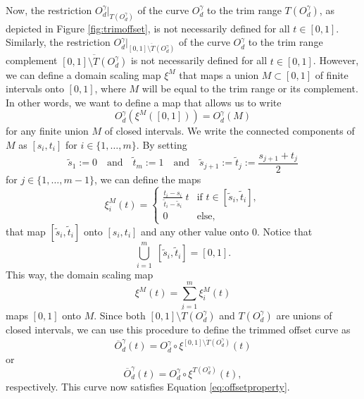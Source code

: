 \documentclass[a4paper, 11pt]{report}
\theoremstyle{definition}
\newcommand{\domrestr}{\big|}
\begin{document}
	Now, the restriction $O^{\gamma}_d \domrestr_{T(O^\gamma_d)}$ of the curve $O^{\gamma}_d$ to the trim range $T(O^\gamma_d)$, as depicted in Figure \ref{fig:trimoffset}, is not necessarily defined for all $t \in [0,1]$. Similarly, the restriction $O^{\gamma}_d \domrestr_{\overline{[0,1] \setminus T(O^\gamma_d)}}$ of the curve $O^{\gamma}_d$ to the trim range complement $\overline{[0,1] \setminus T(O^\gamma_d)}$ is not necessarily defined for all $t \in [0,1]$. However, we can define a domain scaling map $\xi^M$ that maps a union $M \subset [0,1]$ of finite intervals onto $[0,1]$, where $M$ will be equal to the trim range or its complement. In other words, we want to define a map that allows us to write
		$$O^{\gamma}_d(\xi^M([0,1])) = O^{\gamma}_d (M)$$
	for any finite union $M$ of closed intervals.
	We write the connected components of $M$ as $[s_i, t_i]$ for $i \in \{1,\ldots,m\}$. By setting
		$$ \tilde s_1 := 0 \quad\text{and}\quad \tilde t_m := 1 \quad\text{and}\quad \tilde s_{j+1} := \tilde t_j := \frac{s_{j+1} + t_j}{2} $$
	for $j \in \{1,\ldots,m-1\}$, we can define the maps
		$$ \xi^M_i(t) = 
				\begin{cases}
					\frac{t_i - s_i}{\tilde t_i - \tilde s_i} \; t 	&\text{if } t \in [\tilde s_i, \tilde t_i], \\
					0 												&\text{else},
				\end{cases}
		$$
	that map $[\tilde s_i, \tilde t_i]$ onto $[s_i, t_i]$ and any other value onto $0$. Notice that
		$$ \bigcup_{i=1}^m \; [\tilde s_i, \tilde t_i] = [0,1].$$
	This way, the domain scaling map
		$$ \xi^M(t) = \sum_{i=1}^m \xi^M_i(t) $$
	maps $[0,1]$ onto $M$. Since both $\overline{[0,1] \setminus T(O^\gamma_d)}$ and $T(O^\gamma_d)$ are unions of closed intervals, we can use this procedure to define the trimmed offset curve as
		$$ \overline{O}^\gamma_d (t) = O^\gamma_d \circ \xi^{\overline{[0,1] \setminus T(O^\gamma_d)}}(t)$$
	or 
		$$ \overline{O}^\gamma_d (t) = O^\gamma_d \circ \xi^{T(O^\gamma_d)}(t),$$
	respectively. This curve now satisfies Equation \ref{eq:offsetproperty}.
\end{document}
